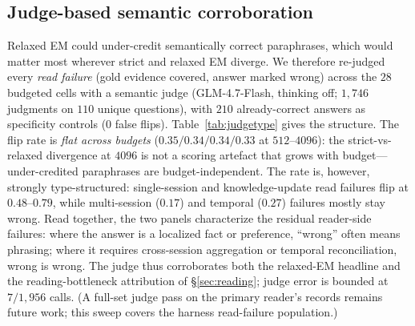 \documentclass{article} %
\begin{document}
\begin{table}[h]
\centering\scriptsize
\caption{Cross-reader comparison at $B{=}4096$ (relaxed EM). Column heads give the reader and
its question set; every digit comes from that reader's own grid, and the GLM-4.7 column is a
frozen-artifact probe with per-cell $n$ of $26$--$60$. Read within columns; the object of
interest is the ordering \emph{across} columns. Sources: \texttt{tables500/} and
Supplement, Section~D.}
\label{tab:reader}

\end{table}

\subsection{Judge-based semantic corroboration}
\label{sec:judge}
Relaxed EM could under-credit semantically correct paraphrases, which would matter most
wherever strict and relaxed EM diverge. We therefore re-judged every \emph{read failure}
(gold evidence covered, answer marked wrong) across the $28$ budgeted cells with a semantic
judge (GLM-4.7-Flash, thinking off; $1{,}746$ judgments on $110$ unique questions), with
$210$ already-correct answers as specificity controls ($0$ false flips).
Table~\ref{tab:judgetype} gives the structure. The flip rate is \emph{flat across
budgets} ($0.35/0.34/0.34/0.33$ at $512$--$4096$): the strict-vs-relaxed divergence at
$4096$ is not a scoring artefact that grows with budget---under-credited paraphrases are
budget-independent. The rate is, however, strongly type-structured: single-session and
knowledge-update read failures flip at $0.48$--$0.79$, while multi-session ($0.17$) and
temporal ($0.27$) failures mostly stay wrong. Read together, the two panels characterize
the residual reader-side failures: where the answer is a localized fact or preference,
``wrong'' often means phrasing; where it requires cross-session aggregation or temporal
reconciliation, wrong is wrong. The judge thus corroborates both the relaxed-EM headline
and the reading-bottleneck attribution of \S\ref{sec:reading}; judge error is
bounded at $7/1{,}956$ calls. (A full-set judge pass on the primary reader's records
remains future work; this sweep covers the harness read-failure population.)

\begin{table}[h]
\centering\scriptsize
\caption{Semantic judge on read failures (E4): flips to ``semantically correct'' by
question type (top) and by budget across all types (bottom); controls never flip.
Judge-corrected EM lifts every cell by $+0.02$--$0.28$ \emph{without reordering} the
$512$/$1024$ policy ranking (Supplement). Source
\texttt{tables/judge\_type.tex} (regenerated by \texttt{judge\_type.py}
from \texttt{judge\_full.json}).}
\label{tab:judgetype}

\end{table}
\end{document}
